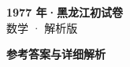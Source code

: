 \documentclass[zihao=-4, a4paper]{ctexart}
\begin{document}
\begin{center}
  {\Large\bfseries 1977 年·黑龙江初试卷}\\[4pt]
  {\large 数学 · 解析版}
\end{center}
\medskip
{}

\clearpage
{}
\begin{center}{\Large\bfseries 参考答案与详细解析}\end{center}
\medskip

\end{document}
